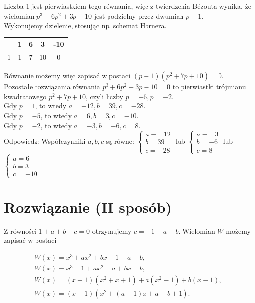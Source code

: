 \documentclass[10pt]{article}
\begin{document}
Liczba 1 jest pierwiastkiem tego równania, więc z twierdzenia Bézouta wynika, że wielomian $p^{3}+6 p^{2}+3 p-10$ jest podzielny przez dwumian $p-1$.\\
Wykonujemy dzielenie, stosując np. schemat Hornera.

\begin{center}
\begin{tabular}{|c|c|c|c|c|}
\hline
 & 1 & 6 & 3 & -10 \\
\hline
1 & 1 & 7 & 10 & 0 \\
\hline
\end{tabular}
\end{center}

Równanie możemy więc zapisać w postaci $(p-1)\left(p^{2}+7 p+10\right)=0$.\\
Pozostałe rozwiązania równania $p^{3}+6 p^{2}+3 p-10=0$ to pierwiastki trójmianu kwadratowego $p^{2}+7 p+10$, czyli liczby $p=-5, p=-2$.\\
Gdy $p=1$, to wtedy $a=-12, b=39, c=-28$.\\
Gdy $p=-5$, to wtedy $a=6, b=3, c=-10$.\\
Gdy $p=-2$, to wtedy $a=-3, b=-6, c=8$.\\
Odpowiedź: Współczynniki $a, b, c$ są równe: $\left\{\begin{array}{l}a=-12 \\ b=39 \\ c=-28\end{array}\right.$ lub $\left\{\begin{array}{l}a=-3 \\ b=-6 \\ c=8\end{array}\right.$ lub $\left\{\begin{array}{l}a=6 \\ b=3 \\ c=-10\end{array}\right.$

\section*{Rozwiązanie (II sposób)}
Z równości $1+a+b+c=0$ otrzymujemy $c=-1-a-b$. Wielomian $W$ możemy zapisać w postaci

$$
\begin{gathered}
W(x)=x^{3}+a x^{2}+b x-1-a-b, \\
W(x)=x^{3}-1+a x^{2}-a+b x-b, \\
W(x)=(x-1)\left(x^{2}+x+1\right)+a\left(x^{2}-1\right)+b(x-1), \\
W(x)=(x-1)\left(x^{2}+(a+1) x+a+b+1\right) .
\end{gathered}
$$
\end{document}
